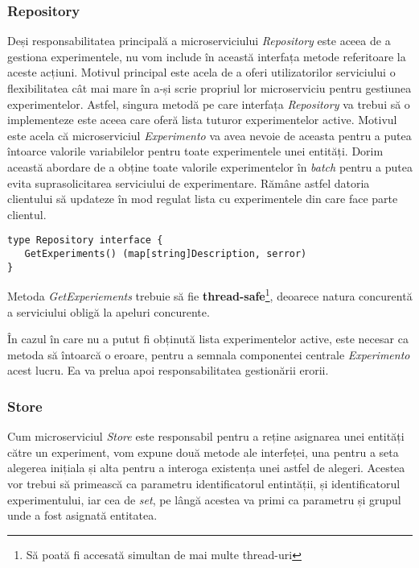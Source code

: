 \subsubsection{Repository}

Deși responsabilitatea principală a microserviciului \textit{Repository} este aceea de a gestiona experimentele, nu vom include în această interfața metode referitoare la aceste acțiuni. Motivul principal este acela de a oferi utilizatorilor serviciului o flexibilitatea cât mai mare în a-și scrie propriul lor microserviciu pentru gestiunea experimentelor. Astfel, singura metodă pe care interfața \textit{Repository} va trebui să o implementeze este aceea care oferă lista tuturor experimentelor active. Motivul este acela că microserviciul \textit{Experimento} va avea nevoie de aceasta pentru a putea întoarce valorile variabilelor pentru toate experimentele unei entități. Dorim această abordare de a obține toate valorile experimentelor în \textit{batch} pentru a putea evita suprasolicitarea serviciului de experimentare. Rămâne astfel datoria clientului să updateze în mod regulat lista cu experimentele din care face parte clientul. 


\begin{center}
	\begin{lstlisting}[language=proto3]
type Repository interface {
   GetExperiments() (map[string]Description, serror)
}
	\end{lstlisting}
\end{center}

\begin{remark}
	Metoda \textit{GetExperiements} trebuie să fie \textbf{thread-safe}\footnote{Să poată fi accesată simultan de mai multe thread-uri}, deoarece natura concurentă a serviciului obligă la apeluri concurente.
\end{remark}

În cazul în care nu a putut fi obținută lista experimentelor active, este necesar ca metoda să întoarcă o eroare, pentru a semnala componentei centrale \textit{Experimento} acest lucru. Ea va prelua apoi responsabilitatea gestionării erorii.

\subsubsection{Store}

Cum microserviciul \textit{Store} este responsabil pentru a reține asignarea unei entități către un experiment, vom expune două metode ale interfeței, una pentru a seta alegerea inițiala și alta pentru a interoga existența unei astfel de alegeri. Acestea vor trebui să primească ca parametru identificatorul entintății, și identificatorul experimentului, iar cea de \textit{set}, pe lângă acestea va primi ca parametru și grupul unde a fost asignată entitatea.

